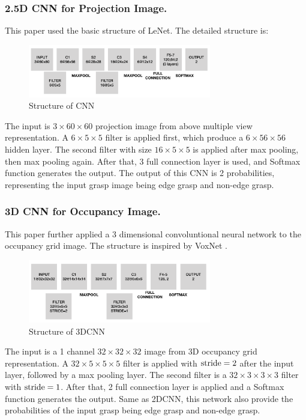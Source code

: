 \documentclass[letterpaper]{article} %
\begin{document}
\subsubsection{2.5D CNN for Projection Image.} This paper used the basic structure of LeNet\cite{RN3}. The detailed structure is:
\begin{figure}[H]
    \centering
    \includegraphics[width=8cm]{images/CNN.png}
    \caption{Structure of CNN}
    \label{fig:my_label}
\end{figure}
The input is $3\times60\times60$ projection image from above multiple view representation. A $6\times5\times5$ filter is applied first, which produce a $6\times56\times56$ hidden layer. The second filter with size $16\times5\times5$ is applied after max pooling, then max pooling again. After that, 3 full connection layer is used, and Softmax function generates the output. The output of this CNN is 2 probabilities, representing the input grasp image being edge grasp and non-edge grasp.

\subsubsection{3D CNN for Occupancy Image.} This paper further applied a 3 dimensional convoluntional neural network to the occupancy grid image. The structure is inspired by VoxNet \cite{RN4}. 
\begin{figure}[H]
    \centering
    \includegraphics[width=8cm]{images/3DCNN.png}
    \caption{Structure of 3DCNN}
    \label{fig:my_label}
\end{figure}
The input is a 1 channel $32\times 32\times 32$ image from 3D occupancy grid representation. A $32\times 5 \times 5\times 5$ filter is applied with ${\rm stride}=2$ after the input layer, followed by a max pooling layer. The second filter is a $32\times 3\times 3\times3$ filter with ${\rm stride}=1$. After that, 2 full connection layer is applied and a Softmax function generates the output. Same as 2DCNN, this network also provide the probabilities of the input grasp being edge grasp and non-edge grasp.
\end{document}
